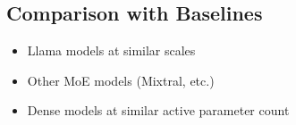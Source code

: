 \subsection{Comparison with Baselines}
    \begin{itemize}
        \item Llama models at similar scales
        \item Other MoE models (Mixtral, etc.)
        \item Dense models at similar active parameter count
    \end{itemize}